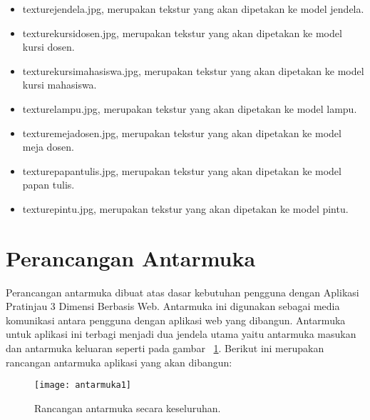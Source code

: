 \begin{itemize}
\begin{itemize}
\begin{itemize}
			\item texturejendela.jpg, merupakan tekstur yang akan dipetakan ke model jendela.
			\item texturekursidosen.jpg, merupakan tekstur yang akan dipetakan ke model kursi dosen.
			\item texturekursimahasiswa.jpg, merupakan tekstur yang akan dipetakan ke model kursi mahasiswa.
			\item texturelampu.jpg, merupakan tekstur yang akan dipetakan ke model lampu.
			\item texturemejadosen.jpg, merupakan tekstur yang akan dipetakan ke model meja dosen.
			\item texturepapantulis.jpg, merupakan tekstur yang akan dipetakan ke model papan tulis.
			\item texturepintu.jpg, merupakan tekstur yang akan dipetakan ke model pintu.
		\end{itemize} 
	\end{itemize}
\end{itemize}

\section{Perancangan Antarmuka}
\label{sec:perancanganAntarmuka}
Perancangan antarmuka dibuat atas dasar kebutuhan pengguna dengan Aplikasi Pratinjau 3 Dimensi Berbasis Web. Antarmuka ini digunakan sebagai media komunikasi antara pengguna dengan aplikasi web yang dibangun. Antarmuka untuk aplikasi ini terbagi menjadi dua jendela utama yaitu antarmuka masukan dan antarmuka keluaran seperti pada gambar ~\ref{fig:antarmuka1}. Berikut ini merupakan rancangan antarmuka aplikasi yang akan dibangun:
\begin{figure}[ht]
	\centering
	\texttt{[image: antarmuka1]}
	\caption{Rancangan antarmuka secara keseluruhan.}
	\label{fig:antarmuka1}
	\vspace{8mm}
\end{figure}

